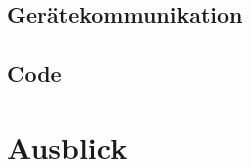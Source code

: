 \documentclass[colorbacktitle,inverttitle,landscape,presentation,
	english,
	aspectratio=43, %
	accentcolor=tud9b, %
]{tudbeamer}
\begin{document}
\subsection{Gerätekommunikation}


\subsection{Code}


\section{Ausblick}


	
%	
%	
%
%	
%	
%	
%		
\end{document}
